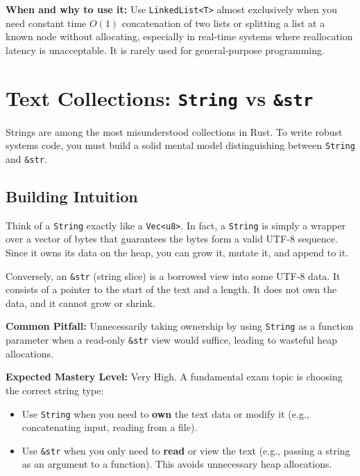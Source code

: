 \textbf{When and why to use it:} Use \texttt{LinkedList<T>} almost exclusively when you need constant time $O(1)$ concatenation of two lists or splitting a list at a known node without allocating, especially in real-time systems where reallocation latency is unacceptable. It is rarely used for general-purpose programming.

\section{Text Collections: \texttt{String} vs \texttt{\&str}}

Strings are among the most misunderstood collections in Rust. To write robust systems code, you must build a solid mental model distinguishing between \texttt{String} and \texttt{\&str}.

\subsection{Building Intuition}
Think of a \texttt{String} exactly like a \texttt{Vec<u8>}. In fact, a \texttt{String} is simply a wrapper over a vector of bytes that guarantees the bytes form a valid UTF-8 sequence. Since it owns its data on the heap, you can grow it, mutate it, and append to it.

Conversely, an \texttt{\&str} (string slice) is a borrowed view into some UTF-8 data. It consists of a pointer to the start of the text and a length. It does not own the data, and it cannot grow or shrink.

\begin{examprioritybox}
\textbf{Common Pitfall:} Unnecessarily taking ownership by using \texttt{String} as a function parameter when a read-only \texttt{\&str} view would suffice, leading to wasteful heap allocations.

\textbf{Expected Mastery Level:} Very High. A fundamental exam topic is choosing the correct string type:
\begin{itemize}
    \item Use \texttt{String} when you need to \textbf{own} the text data or modify it (e.g., concatenating input, reading from a file).
    \item Use \texttt{\&str} when you only need to \textbf{read} or view the text (e.g., passing a string as an argument to a function). This avoids unnecessary heap allocations.
\end{itemize}
\end{examprioritybox}


